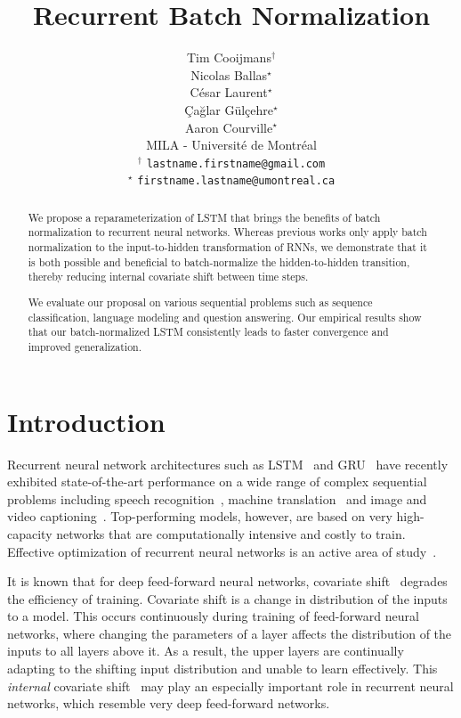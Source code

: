 \documentclass{article} %
\title{Recurrent Batch Normalization}
\author{
Tim Cooijmans$^\dagger$ \\
\And
Nicolas Ballas$^\star$ \\
\And
C\'esar Laurent$^\star$ \\
\And
Çağlar Gülçehre$^\star$ \\
\And
Aaron Courville$^\star$\\
MILA - Universit\'e de Montr\'eal\\
$^\dagger$ \texttt{lastname.firstname@gmail.com} \\
$^\star$ \texttt{firstname.lastname@umontreal.ca} \\
}
\begin{document}
\maketitle

\begin{abstract}
We propose a reparameterization of LSTM that brings the benefits of batch normalization to recurrent neural networks.
Whereas previous works only apply batch normalization to the input-to-hidden transformation of RNNs,
we demonstrate that it is both possible and beneficial to batch-normalize the hidden-to-hidden transition,
thereby reducing internal covariate shift between time steps.

We evaluate our proposal on various sequential problems such as sequence classification, language modeling and question answering.
Our empirical results show that our batch-normalized LSTM consistently leads to faster convergence and improved generalization.
\end{abstract}

\section{Introduction}

Recurrent neural network architectures such as LSTM~\cite{lstm} and GRU~\cite{cho2014learning} have recently exhibited
state-of-the-art performance on a wide range of complex sequential problems including speech recognition~\cite{baidu},
machine translation~\cite{bahdanau2014neural} and image and video captioning~\cite{xu2015show,yao2015describing}.
Top-performing models, however, are based on very high-capacity networks that are computationally intensive and costly to train.
Effective optimization of recurrent neural networks is an active area of study~\cite{pascanudifficulty,hessianfree,ollivier}.

It is known that for deep feed-forward neural networks, covariate shift~\cite{shimodaira2000improving,batchnorm}
degrades the efficiency of training.
Covariate shift is a change in distribution of the inputs to a model.
This occurs continuously during training of feed-forward neural networks,
where changing the parameters of a layer affects the distribution of the inputs to all layers above it.
As a result, the upper layers are continually adapting to the shifting input distribution and unable to learn effectively.
This \emph{internal} covariate shift~\cite{batchnorm} may play an especially important role in recurrent neural networks,
which resemble very deep feed-forward networks.
\end{document}
